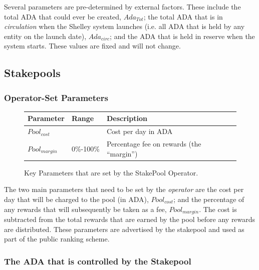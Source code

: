 \documentclass[11pt,a4paper,dvipsnames,twosided,final]{article}
\newcommand{\ada}{ADA{}}
\begin{document}
\noindent
Several parameters are pre-determined by external factors. These include the
total \ada{} that could ever be created, ${Ada}_{Tot}$;
the total \ada{} that is in \emph{circulation} when the Shelley system launches
(i.e. all \ada{} that is held by any entity on the launch date), ${Ada}_{circ}$;
and the \ada{} that is held in reserve when the system starts.
These values are fixed and will not change.

\clearpage
\subsection{Stakepools}

\subsubsection*{Operator-Set Parameters}

\begin{figure}[h!]
\begin{center}
\begin{tabular}{||l|l|p{9cm}||}
  \hline \hline
\textbf{Parameter} & \textbf{Range} & \textbf{Description} \\\hline
{\color{red} $\textit{Pool}_{cost}$} &  & {\color{red} Cost per day in \ada{}} \\\hline
{\color{red} ${Pool}_{margin}$} &  {\color{red} 0\%-100\%} & {\color{red} Percentage fee on rewards (the ``margin'')} \\\hline
  \hline
\end{tabular}
\end{center}
\caption{Key Parameters that are set by the StakePool Operator.}
\end{figure}

\noindent
The two main parameters that need to be set by the \emph{operator} are the cost per day that will be charged to
the pool (in \ada), $\textit{Pool}_{cost}$; and the percentage of any rewards that will subsequently be taken as a fee, ${Pool}_{margin}$.
The cost is subtracted from the total rewards that are earned by the pool before any rewards are distributed.
These parameters are advertised by the stakepool and used as part of the public ranking scheme.

\subsubsection*{The \ada{} that is controlled by the Stakepool}
\end{document}
